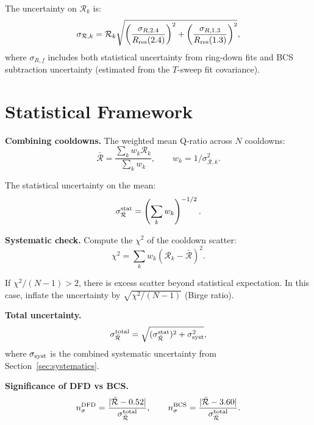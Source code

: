 \documentclass[11pt]{article}
\theoremstyle{definition}
\theoremstyle{remark}
\begin{document}
The uncertainty on $\mathcal{R}_k$ is:
\begin{equation}
\sigma_{\mathcal{R},k} = \mathcal{R}_k
\sqrt{
\left(\frac{\sigma_{R,2.4}}{R_{\rm res}(2.4)}\right)^2
+ \left(\frac{\sigma_{R,1.3}}{R_{\rm res}(1.3)}\right)^2
},
\end{equation}
where $\sigma_{R,f}$ includes both statistical uncertainty from
ring-down fits and BCS subtraction uncertainty (estimated from
the $T$-sweep fit covariance).


\section{Statistical Framework}
\label{sec:statistics}

\textbf{Combining cooldowns.}
The weighted mean Q-ratio across $N$ cooldowns:
\begin{equation}
\bar{\mathcal{R}} = \frac{\sum_k w_k \mathcal{R}_k}{\sum_k w_k},
\qquad w_k = 1/\sigma_{\mathcal{R},k}^2.
\end{equation}

The statistical uncertainty on the mean:
\begin{equation}
\sigma_{\bar{\mathcal{R}}}^{\rm stat}
= \left(\sum_k w_k\right)^{-1/2}.
\end{equation}

\textbf{Systematic check.}
Compute the $\chi^2$ of the cooldown scatter:
\begin{equation}
\chi^2 = \sum_k w_k (\mathcal{R}_k - \bar{\mathcal{R}})^2.
\end{equation}

If $\chi^2 / (N-1) > 2$, there is excess scatter beyond statistical
expectation. In this case, inflate the uncertainty by
$\sqrt{\chi^2/(N-1)}$ (Birge ratio).

\textbf{Total uncertainty.}
\begin{equation}
\sigma_{\bar{\mathcal{R}}}^{\rm total}
= \sqrt{(\sigma_{\bar{\mathcal{R}}}^{\rm stat})^2
+ \sigma_{\rm syst}^2},
\end{equation}
where $\sigma_{\rm syst}$ is the combined systematic uncertainty
from Section~\ref{sec:systematics}.

\textbf{Significance of DFD vs BCS.}
\begin{equation}
n_\sigma^{\rm DFD} = \frac{|\bar{\mathcal{R}} - 0.52|}
{\sigma_{\bar{\mathcal{R}}}^{\rm total}}, \qquad
n_\sigma^{\rm BCS} = \frac{|\bar{\mathcal{R}} - 3.60|}
{\sigma_{\bar{\mathcal{R}}}^{\rm total}}.
\end{equation}
\end{document}
